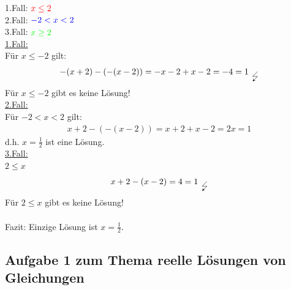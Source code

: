 1.Fall: $ \textcolor{red}{x\leq2} $\\
2.Fall: $\textcolor{blue}{-2<x<2 } $\\
3.Fall: $ \textcolor{green}{x\geq 2} $\vspace*{2mm}\\
\underline{1.Fall:}\\
Für $x\leq-2  $ gilt:\\
\begin{align*}
	-(x+2)-(-(x-2))=-x-2+x-2=-4=1_{ \;\;\tikz \draw[->,>=stealth] (0,0)--++(-0.2,-0.2)--++(0.2,0)--++(-0.2,-0.2);}
\end{align*}
Für $ x\leq-2 $ gibt es keine Lösung!\vspace*{2mm}\\
\underline{2.Fall:}\\
Für $ -2<x<2 $ gilt:\\
\begin{align*}
	x+2-(-(x-2))=x+2+x-2=2x=1
\end{align*}
d.h. $ x=\frac{1}{2} $ ist eine Lösung.\vspace*{2mm}\\
\underline{3.Fall:}\\
$ 2\leq x $\\
\begin{align*}
	x+2-(x-2)=4=1_{ \;\;\tikz \draw[->,>=stealth] (0,0)--++(-0.2,-0.2)--++(0.2,0)--++(-0.2,-0.2);}
\end{align*}
Für $ 2\leq x $ gibt es keine Lösung!\\
\\
Fazit: Einzige Lösung ist $ x=\frac{1}{2} $.\\
\subsection{Aufgabe 1 zum Thema reelle Lösungen von Gleichungen}

